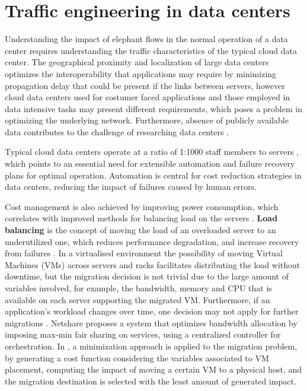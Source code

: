\section {Traffic engineering in data centers}

Understanding the impact of elephant flows in the normal operation of a data center requires understanding the traffic characteristics of the typical cloud 
data center. The geographical proximity and localization of large data centers optimizes the interoperability that applications may require by minimizing 
propagation delay that could be present if the links between servers, however cloud data centers used for costumer faced applications and those employed
in data intensive tasks may present different requirements, which poses a problem in optimizing the underlying network. Furthermore, absence of publicly available
data contributes to the challenge of researching data centers \cite{benson_network_2010}.

\par Typical cloud data centers operate at a ratio of 1:1000 staff members to servers \cite{greenberg_cost_2008}, which points to an essential need for 
extensible automation and failure recovery plans for optimal operation. Automation is central for cost reduction strategies in data centers, reducing the 
impact of failures caused by human errors.

\par Cost management is also achieved by improving power consumption, which correlates with improved methods for balancing load on the servers 
\cite{meng_improving_2010}. \textbf{Load balancing} is the concept of moving the load of an overloaded server to an underutilized one,
which reduces performance degradation, and increase recovery from failures \cite{singh_server-storage_2008}. In a virtualised environment the possibility
of moving Virtual Machines (VMs) across servers and racks facilitates distributing the load without downtime, but the migration decision is not trivial due to the
large amount of variables involved, for example, the bandwidth, memory and CPU that is available on each server supporting the migrated VM. Furthermore, if an
application's workload changes over time, one decision may not apply for further migrations \cite{xu_multi-objective_2010}. Netshare
\cite{radhakrishnan_netshare_2012} proposes a system that optimizes bandwidth allocation by imposing max-min fair sharing on services, using a 
centralized controller for orchestration. In \cite{shrivastava_application-aware_2011}, a minimization approach is applied to the migration problem, by generating
a cost function considering the variables associated to VM placement, computing the impact of moving a certain VM to a physical host, and the migration destination
is selected with the least amount of generated impact.

